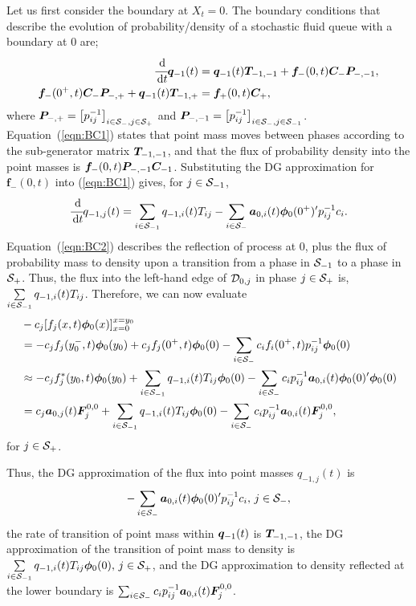 Let us first consider the boundary at \( X_t=0\). The boundary conditions that describe the evolution of probability/density of a stochastic fluid queue with a boundary at \(0\) are;
\begin{align}\label{eqn:BC1}
\cfrac{\, \mathrm{d}}{\, \mathrm{d} t}\boldsymbol q_{-1}(t) &= \boldsymbol q_{-1}(t) \boldsymbol T_{{-1},{-1}} + \boldsymbol f_-(0,t)\boldsymbol C_-\boldsymbol P_{-,{-1}},
\\\label{eqn:BC2}
\boldsymbol f_-(0^+,t)\boldsymbol C_-\boldsymbol P_{-,+} + \boldsymbol q_{-1}(t)\boldsymbol T_{{-1},+}&=\boldsymbol f_+(0,t)\boldsymbol C_+,
\end{align}
where \(\boldsymbol P_{-,+} = \left[p_{ij}^{-1}\right]_{i\in\mathcal{S}_-,j\in\mathcal{S}_{+}}\) and \(\boldsymbol P_{-,{-1}} = \left[p_{ij}^{-1}\right]_{i\in\mathcal{S}_-,j\in\mathcal{S}_{-1}}\). Equation~(\ref{eqn:BC1}) states that point mass moves between phases according to the sub-generator matrix \(\boldsymbol T_{{-1},{-1}}\), and that the flux of probability density into the point masses is \(\boldsymbol f_-(0,t)\boldsymbol P_{-,{-1}}\boldsymbol C_{-1}\). Substituting the DG approximation for \(\boldsymbol f_-(0,t)\) into (\ref{eqn:BC1}) gives, for \(j\in\mathcal{S}_{-1}\), 
\begin{equation*}\label{eqn:DGBC1}
\cfrac{\, \mathrm{d}}{\, \mathrm{d} t} q_{{-1},j}(t) = \sum_{i\in\mathcal{S}_{-1}} q_{{-1},i}(t) T_{i j} - \sum_{i\in\mathcal{S}_-}\boldsymbol a_{0,i}(t)\boldsymbol \phi_0(0^+)'{}p_{ij}^{-1} c_i.
\end{equation*}
Equation~(\ref{eqn:BC2}) describes the reflection of process at \(0\), plus the flux of probability mass to density upon a transition from a phase in \(\mathcal{S}_{-1}\) to a phase in \(\mathcal{S}_+\). Thus, the flux into the left-hand edge of \(\mathcal{D}_{0,j}\) in phase \(j\in\mathcal{S}_+\) is, \(\sum\limits_{i\in\mathcal{S}_{-1}} q_{{-1},i}(t)T_{ij}\). Therefore, we can now evaluate 
\begin{align*}
	&-c_j[f_j(x,t)\boldsymbol\phi_0(x)]_{x=0}^{x=y_{0}} 
	\\& =  -c_jf_j(y_0^-,t)\boldsymbol\phi_0(y_0)+c_jf_j(0^+,t)\boldsymbol\phi_0(0) - \sum_{i\in\mathcal{S}_-}c_if_i(0^+,t)p_{ij}^{-1}\boldsymbol \phi_0(0)
	\\& \approx -c_j f_j^*(y_0,t)\boldsymbol\phi_0(y_0)+\sum_{i\in\mathcal{S}_{-1}}q_{{-1},i}(t)T_{ij}\boldsymbol\phi_0(0) - \sum_{i\in\mathcal{S}_-}c_ip_{ij}^{-1}\boldsymbol a_{0,i}(t)\boldsymbol \phi_0(0)'{}\boldsymbol \phi_0(0)
	\\& = c_j\boldsymbol a_{0,j}(t)\boldsymbol F_j^{0,0}+\sum_{i\in\mathcal{S}_{-1}}q_{{-1},i}(t)T_{ij}\boldsymbol\phi_0(0) - \sum_{i\in\mathcal{S}_-}c_ip_{ij}^{-1}\boldsymbol a_{0,i}(t)\boldsymbol F_j^{0,0},
\end{align*}
for \(j \in \mathcal{S}_+\). 

Thus, the DG approximation of the flux into point masses \(q_{{-1},j}(t)\) is \[-\sum_{i\in\mathcal{S}_-}\boldsymbol a_{0,i}(t)\boldsymbol \phi_0(0)'{} p_{ij}^{-1} c_i,\,j\in\mathcal{S}_-,\] the rate of transition of point mass within \(\boldsymbol q_{{-1}}(t)\) is \(\boldsymbol T_{{-1},{-1}}\), the DG approximation of the transition of point mass to density is \(\sum\limits_{i\in\mathcal{S}_{-1}}q_{{-1},i}(t)T_{ij}\boldsymbol\phi_0(0),\,j\in\mathcal{S}_+\), and the DG approximation to density reflected at the lower boundary is \(\sum_{i\in\mathcal{S}_-}c_ip_{ij}^{-1}\boldsymbol a_{0,i}(t)\boldsymbol F_j^{0,0}\). 

